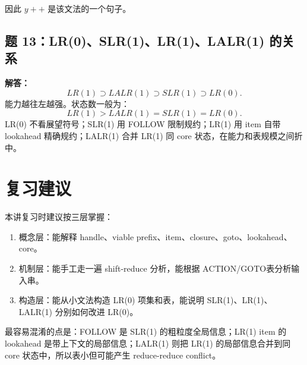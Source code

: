 \documentclass[UTF8,fontset=none,11pt]{ctexart}
\newcommand{\ACTION}{\ensuremath{\mathrm{ACTION}}}
\newcommand{\GOTO}{\ensuremath{\mathrm{GOTO}}}
\begin{document}
因此 \(y++\) 是该文法的一个句子。

\subsection*{题 13：LR(0)、SLR(1)、LR(1)、LALR(1) 的关系}

\textbf{解答：}
\[
LR(1) \supset LALR(1) \supset SLR(1) \supset LR(0).
\]
能力越往左越强。状态数一般为：
\[
LR(1) > LALR(1)=SLR(1)=LR(0).
\]
LR(0) 不看展望符号；SLR(1) 用 FOLLOW 限制规约；LR(1) 用 item 自带 lookahead 精确规约；LALR(1) 合并 LR(1) 同 core 状态，在能力和表规模之间折中。

\section*{复习建议}

本讲复习时建议按三层掌握：

\begin{enumerate}
  \item 概念层：能解释 handle、viable prefix、item、closure、goto、lookahead、core。
  \item 机制层：能手工走一遍 shift-reduce 分析，能根据 \ACTION/\GOTO 表分析输入串。
  \item 构造层：能从小文法构造 LR(0) 项集和表，能说明 SLR(1)、LR(1)、LALR(1) 分别如何改进 LR(0)。
\end{enumerate}

最容易混淆的点是：FOLLOW 是 SLR(1) 的粗粒度全局信息；LR(1) item 的 lookahead 是带上下文的局部信息；LALR(1) 则把 LR(1) 的局部信息合并到同 core 状态中，所以表小但可能产生 reduce-reduce conflict。
\end{document}
